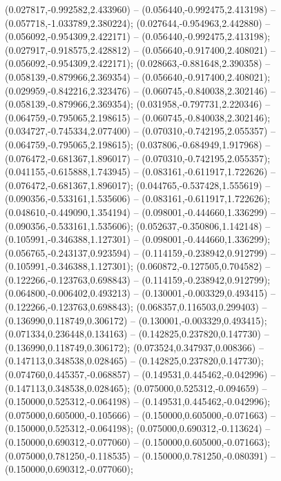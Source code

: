  (0.027817,-0.992582,2.433960) -- (0.056440,-0.992475,2.413198) -- (0.057718,-1.033789,2.380224);
 (0.027644,-0.954963,2.442880) -- (0.056092,-0.954309,2.422171) -- (0.056440,-0.992475,2.413198);
 (0.027917,-0.918575,2.428812) -- (0.056640,-0.917400,2.408021) -- (0.056092,-0.954309,2.422171);
 (0.028663,-0.881648,2.390358) -- (0.058139,-0.879966,2.369354) -- (0.056640,-0.917400,2.408021);
 (0.029959,-0.842216,2.323476) -- (0.060745,-0.840038,2.302146) -- (0.058139,-0.879966,2.369354);
 (0.031958,-0.797731,2.220346) -- (0.064759,-0.795065,2.198615) -- (0.060745,-0.840038,2.302146);
 (0.034727,-0.745334,2.077400) -- (0.070310,-0.742195,2.055357) -- (0.064759,-0.795065,2.198615);
 (0.037806,-0.684949,1.917968) -- (0.076472,-0.681367,1.896017) -- (0.070310,-0.742195,2.055357);
 (0.041155,-0.615888,1.743945) -- (0.083161,-0.611917,1.722626) -- (0.076472,-0.681367,1.896017);
 (0.044765,-0.537428,1.555619) -- (0.090356,-0.533161,1.535606) -- (0.083161,-0.611917,1.722626);
 (0.048610,-0.449090,1.354194) -- (0.098001,-0.444660,1.336299) -- (0.090356,-0.533161,1.535606);
 (0.052637,-0.350806,1.142148) -- (0.105991,-0.346388,1.127301) -- (0.098001,-0.444660,1.336299);
 (0.056765,-0.243137,0.923594) -- (0.114159,-0.238942,0.912799) -- (0.105991,-0.346388,1.127301);
 (0.060872,-0.127505,0.704582) -- (0.122266,-0.123763,0.698843) -- (0.114159,-0.238942,0.912799);
 (0.064800,-0.006402,0.493213) -- (0.130001,-0.003329,0.493415) -- (0.122266,-0.123763,0.698843);
 (0.068357,0.116503,0.299403) -- (0.136990,0.118749,0.306172) -- (0.130001,-0.003329,0.493415);
 (0.071334,0.236448,0.134163) -- (0.142825,0.237820,0.147730) -- (0.136990,0.118749,0.306172);
 (0.073524,0.347937,0.008366) -- (0.147113,0.348538,0.028465) -- (0.142825,0.237820,0.147730);
 (0.074760,0.445357,-0.068857) -- (0.149531,0.445462,-0.042996) -- (0.147113,0.348538,0.028465);
 (0.075000,0.525312,-0.094659) -- (0.150000,0.525312,-0.064198) -- (0.149531,0.445462,-0.042996);
 (0.075000,0.605000,-0.105666) -- (0.150000,0.605000,-0.071663) -- (0.150000,0.525312,-0.064198);
 (0.075000,0.690312,-0.113624) -- (0.150000,0.690312,-0.077060) -- (0.150000,0.605000,-0.071663);
 (0.075000,0.781250,-0.118535) -- (0.150000,0.781250,-0.080391) -- (0.150000,0.690312,-0.077060);
